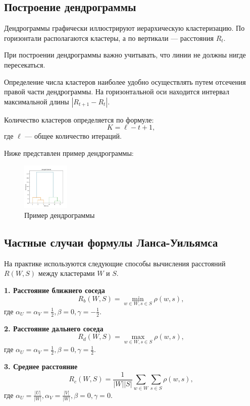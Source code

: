 \subsection{Построение дендрограммы}
Дендрограммы графически иллюстрируют иерархическую кластеризацию. По горизонтали располагаются кластеры, а по вертикали — расстояния \( R_t \). 

При построении дендрограммы важно учитывать, что линии не должны нигде пересекаться. 

Определение числа кластеров наиболее удобно осуществлять путем отсечения правой части дендрограммы. На горизонтальной оси находится интервал максимальной длины \( |R_{t+1} - R_t| \).

Количество кластеров определяется по формуле:
\[
K = \ell - t + 1,
\]
где \( \ell \) — общее количество итераций.

Ниже представлен пример  дендрограммы:

\begin{figure}[h!]
    \centering
    \includegraphics[width=0.2\textwidth]{png/example.jpg} %
    \caption{Пример дендрограммы}
\end{figure}


\subsection{Частные случаи формулы Ланса-Уильямса}

На практике используются следующие способы вычисления расстояний \( R(W, S) \) между кластерами \( W \) и \( S \).

\textbf{1. Расстояние ближнего соседа}
\[
R_b(W, S) = \min_{w \in W, s \in S} \rho(w, s),
\]
где \( \alpha_U = \alpha_V = \frac{1}{2}, \beta = 0, \gamma = -\frac{1}{2} \).

\textbf{2. Расстояние дальнего соседа}
\[
R_d(W, S) = \max_{w \in W, s \in S} \rho(w, s),
\]
где \( \alpha_U = \alpha_V = \frac{1}{2}, \beta = 0, \gamma = \frac{1}{2} \).

\textbf{3. Среднее расстояние}
\[
R_c(W, S) = \frac{1}{|W||S|} \sum_{w \in W} \sum_{s \in S} \rho(w, s),
\]
где \( \alpha_U = \frac{|U|}{|W|}, \alpha_V = \frac{|V|}{|W|}, \beta = 0, \gamma = 0 \).

